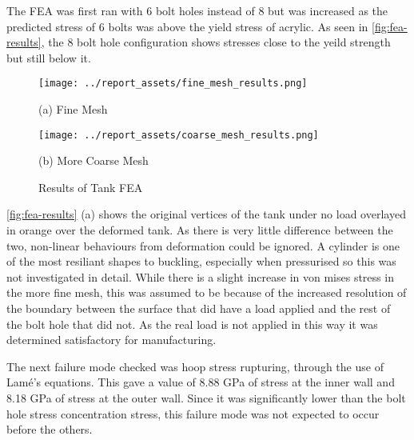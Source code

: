 The FEA was first ran with 6 bolt holes instead of 8 but was increased as the predicted stress of 6 bolts was above the yield stress of acrylic. As seen in \autoref{fig:fea-results}, the 8 bolt hole configuration shows stresses close to the yeild strength but still below it.
\begin{figure}[htbp]
    \centering

    \begin{minipage}{0.45\textwidth}
        \centering
        \texttt{[image: ../report\_assets/fine\_mesh\_results.png]}
        \caption*{(a) Fine Mesh}
    \end{minipage}    
    \hfill
    \begin{minipage}{0.45\textwidth}
        \centering
        \texttt{[image: ../report\_assets/coarse\_mesh\_results.png]}
        \caption*{(b) More Coarse Mesh}
    \end{minipage}    
    \caption{Results of Tank FEA}\label{fig:fea-results}

\end{figure}  
\autoref{fig:fea-results} (a) shows the original vertices of the tank under no load overlayed in orange over the deformed tank. As there is very little difference between the two, non-linear behaviours from deformation could be ignored. A cylinder is one of the most resiliant shapes to buckling, especially when pressurised so this was not investigated in detail. While there is a slight increase in von mises stress in the more fine mesh, this was assumed to be because of the increased resolution of the boundary between the surface that did have a load applied and the rest of the bolt hole that did not. As the real load is not applied in this way it was determined satisfactory for manufacturing.

The next failure mode checked was hoop stress rupturing, through the use of Lamé's equations. This gave a value of 8.88 GPa of stress at the inner wall and 8.18 GPa of stress at the outer wall. Since it was significantly lower than the bolt hole stress concentration stress, this failure mode was not expected to occur before the others.

